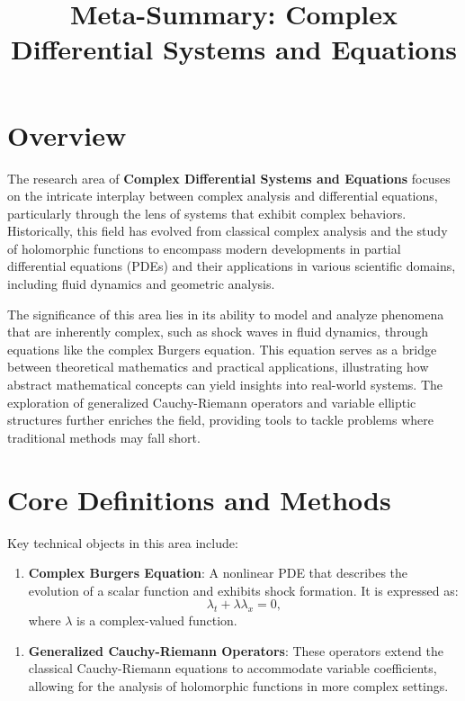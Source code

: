\documentclass[11pt,a4paper]{article}
\title{Meta-Summary: Complex Differential Systems and Equations}
\date{}
\begin{document}
\maketitle

\section{Overview}

The research area of \textbf{Complex Differential Systems and Equations} focuses on the intricate interplay between complex analysis and differential equations, particularly through the lens of systems that exhibit complex behaviors. Historically, this field has evolved from classical complex analysis and the study of holomorphic functions to encompass modern developments in partial differential equations (PDEs) and their applications in various scientific domains, including fluid dynamics and geometric analysis.

The significance of this area lies in its ability to model and analyze phenomena that are inherently complex, such as shock waves in fluid dynamics, through equations like the complex Burgers equation. This equation serves as a bridge between theoretical mathematics and practical applications, illustrating how abstract mathematical concepts can yield insights into real-world systems. The exploration of generalized Cauchy-Riemann operators and variable elliptic structures further enriches the field, providing tools to tackle problems where traditional methods may fall short.

\section{Core Definitions and Methods}

Key technical objects in this area include:

\begin{enumerate}
\item \textbf{Complex Burgers Equation}: A nonlinear PDE that describes the evolution of a scalar function and exhibits shock formation. It is expressed as:
\[
\lambda_t + \lambda \lambda_x = 0,
\]
where \(\lambda\) is a complex-valued function.
\end{enumerate}

\begin{enumerate}
\item \textbf{Generalized Cauchy-Riemann Operators}: These operators extend the classical Cauchy-Riemann equations to accommodate variable coefficients, allowing for the analysis of holomorphic functions in more complex settings.
\end{enumerate}
\end{document}
